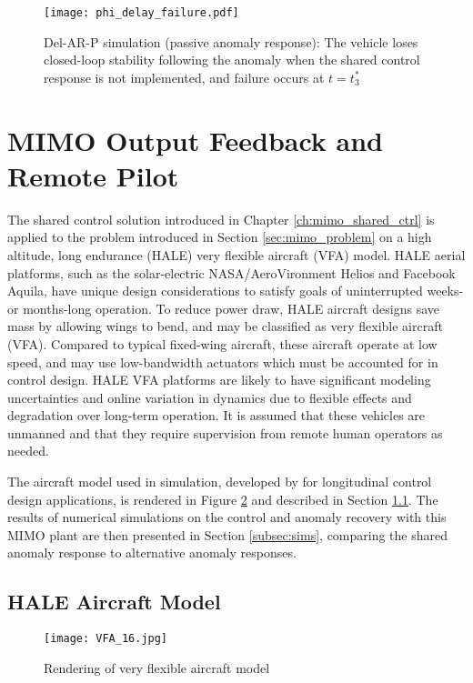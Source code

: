 \begin{figure}[h!]
	\centering
	\texttt{[image: phi\_delay\_failure.pdf]}
	\caption{Del-AR-P simulation (passive anomaly response): The vehicle loses closed-loop stability following the anomaly when the shared control response is not implemented, and failure occurs at $t = t_3^*$}
	\label{fig:command_and_output_d_fail}
\end{figure}

\clearpage

\section{MIMO Output Feedback and Remote Pilot}
The shared control solution introduced in Chapter \ref{ch:mimo_shared_ctrl} is applied to the problem introduced in Section \ref{sec:mimo_problem} on a high altitude, long endurance (HALE) very flexible aircraft (VFA) model. HALE aerial platforms, such as the solar-electric NASA/AeroVironment Helios and Facebook Aquila, have unique design considerations to satisfy goals of uninterrupted weeks- or months-long operation. To reduce power draw, HALE aircraft designs save mass by allowing wings to bend, and may be classified as very flexible aircraft (VFA). Compared to typical fixed-wing aircraft, these aircraft operate at low speed, and may use low-bandwidth actuators which must be accounted for in control design. HALE VFA platforms are likely to have significant modeling uncertainties and online variation in dynamics due to flexible effects and degradation over long-term operation. It is assumed that these vehicles are unmanned and that they require supervision from remote human operators as needed.

The aircraft model used in simulation, developed by \cite{gibson2011modeling} for longitudinal control design applications, is rendered in Figure \ref{fig:vfa} and described in Section \ref{subsec:vfa_model}. The results of numerical simulations on the control and anomaly recovery with this MIMO plant are then presented in Section \ref{subsec:sims}, comparing the shared anomaly response to alternative anomaly responses.

\subsection{HALE Aircraft Model}\label{subsec:vfa_model}

\begin{figure}[htbp]
	\centering
	\texttt{[image: VFA\_16.jpg]}
	\caption{Rendering of very flexible aircraft model}
	\label{fig:vfa}
\end{figure}

